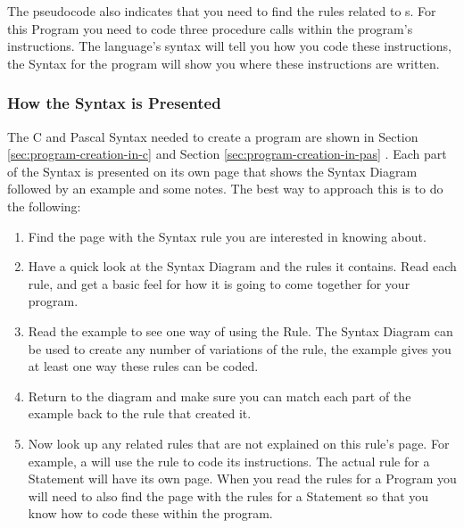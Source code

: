 
The pseudocode also indicates that you need to find the rules related to s. For this Program you need to code three procedure calls within the program's instructions. The language's syntax will tell you how you code these instructions, the Syntax for the program will show you where these instructions are written.


\subsubsection{How the Syntax is Presented} %
\label{ssub:how_the_syntax_is_presented}

The C and Pascal Syntax needed to create a program are shown in Section \ref{sec:program-creation-in-c}  and Section \ref{sec:program-creation-in-pas} . Each part of the Syntax is presented on its own page that shows the Syntax Diagram followed by an example and some notes. The best way to approach this is to do the following:

\begin{enumerate}
  \item Find the page with the Syntax rule you are interested in knowing about.
  \item Have a quick look at the Syntax Diagram and the rules it contains. Read each rule, and get a basic feel for how it is going to come together for your program.
  \item Read the example to see one way of using the Rule. The Syntax Diagram can be used to create any number of variations of the rule, the example gives you at least one way these rules can be coded.
  \item Return to the diagram and make sure you can match each part of the example back to the rule that created it.
  \item Now look up any related rules that are not explained on this rule's page. For example, a  will use the  rule to code its instructions. The actual rule for a Statement will have its own page. When you read the rules for a Program you will need to also find the page with the rules for a Statement so that you know how to code these within the program.
\end{enumerate}

